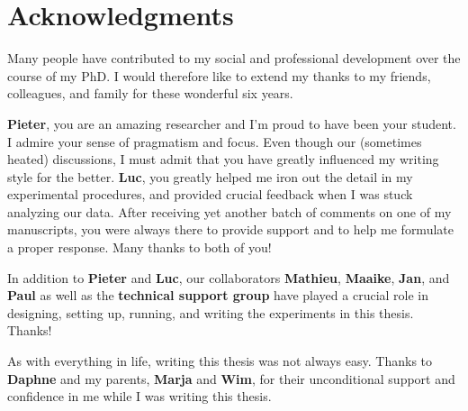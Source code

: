 \clearpage

\chapter*{Acknowledgments}
{}

Many people have contributed to my social and professional development over the course of my PhD. I would therefore like to extend my thanks to my friends, colleagues, and family for these wonderful six years.

\textbf{Pieter}, you are an amazing researcher and I'm proud to have been your student. I admire your sense of pragmatism and focus. Even though our (sometimes heated) discussions, I must admit that you have greatly influenced my writing style for the better. \textbf{Luc}, you greatly helped me iron out the detail in my experimental procedures, and provided crucial feedback when I was stuck analyzing our data. After receiving yet another batch of comments on one of my manuscripts, you were always there to provide support and to help me formulate a proper response. Many thanks to both of you!

In addition to \textbf{Pieter} and \textbf{Luc}, our collaborators \textbf{Mathieu}, \textbf{Maaike}, \textbf{Jan}, and \textbf{Paul} as well as the \textbf{technical support group} have played a crucial role in designing, setting up, running, and writing the experiments in this thesis. Thanks!

As with everything in life, writing this thesis was not always easy. Thanks to \textbf{Daphne} and my parents, \textbf{Marja} and \textbf{Wim}, for their unconditional support and confidence in me while I was writing this thesis.
